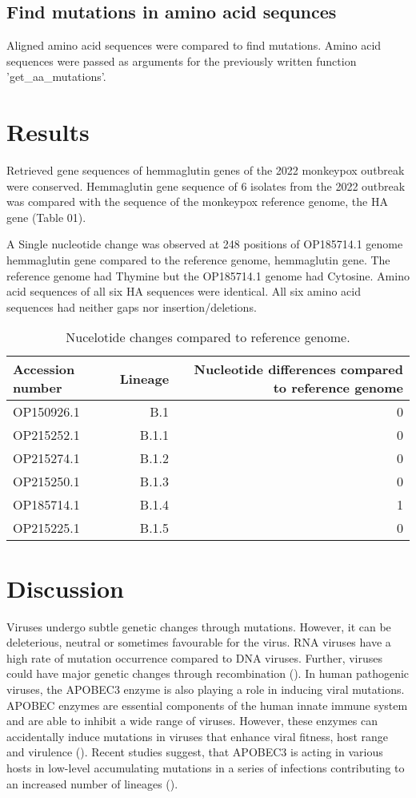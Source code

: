 \documentclass[fleqn,10pt]{olplainarticle}
\begin{document}
\subsection*{Find mutations in amino acid sequnces}
Aligned amino acid sequences were compared to find mutations. Amino acid sequences were passed as arguments for the previously written function 'get\_aa\_mutations'. 


\section*{Results}

Retrieved gene sequences of hemmaglutin genes of the 2022 monkeypox outbreak were conserved. Hemmaglutin gene sequence of  6 isolates from the 2022 outbreak was compared with the sequence of the monkeypox reference genome, the HA gene (Table 01).

 A Single nucleotide change was observed at 248 positions of  OP185714.1 genome hemmaglutin gene compared to the reference genome, hemmaglutin gene. The reference genome had Thymine but the OP185714.1 genome had Cytosine. Amino acid sequences of all six HA sequences were identical. All six amino acid sequences had neither gaps nor insertion/deletions.
 \begin{table}[ht]
\centering
\begin{tabular}{l|r| r}
Accession number & Lineage & Nucleotide differences compared to reference genome \\\hline
OP150926.1 & B.1 & 0 \\
OP215252.1 & B.1.1 & 0 \\
OP215274.1 & B.1.2 & 0\\
OP215250.1 & B.1.3 & 0\\
OP185714.1 & B.1.4 & 1\\
OP215225.1 & B.1.5 & 0\\
\end{tabular}
\caption{\label{tab:widgets}Nucelotide changes compared to reference genome.}
\end{table}

\section*{Discussion}
Viruses undergo subtle genetic changes through mutations. However, it can be deleterious, neutral or sometimes favourable for the virus. RNA viruses have a high rate of mutation occurrence compared to DNA viruses. Further, viruses could have major genetic changes through recombination (\cite{fleischmann1996viral}).  In human pathogenic viruses, the APOBEC3 enzyme is also playing a role in inducing viral mutations. APOBEC enzymes are essential components of the human innate immune system and are able to inhibit a wide range of viruses. However, these enzymes can accidentally induce mutations in viruses that enhance viral fitness, host range and virulence (\cite{sadeghpour2021human}). Recent studies suggest, that APOBEC3 is acting in various hosts in low-level accumulating mutations in a series of infections contributing to an increased number of lineages (\cite{gigante2022multiple}). 
\end{document}
